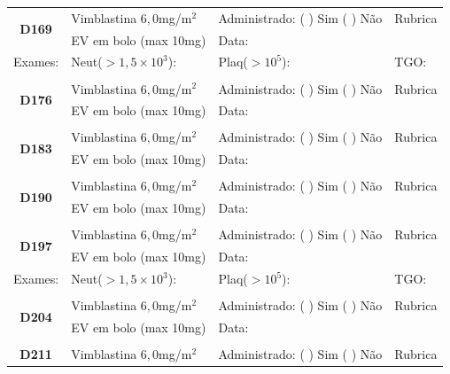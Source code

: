 \documentclass[11pt,a4paper,oldfontcommands]{memoir}
\begin{document}
\begin{center}
\begin{table}[H]
\begin{tabular}{p{}p{}|p{}|p{3cm}}
\end{tabular}
\end{table}
\clearpage
\begin{table}[H]
\begin{tabular}{p{}p{}|p{}|p{3cm}}
    \hline
    \multicolumn{1}{c|}{\multirow{2}{*}{\textbf{D169}}}&{Vimblastina \(6,0\)mg/m\(^2\)}&{Administrado: (  ) Sim (  ) Não}&{Rubrica}\\
    \multicolumn{1}{c|}{}&{EV em bolo (max 10mg)}&{Data:}&\\
    \hline
    {Exames:}&{Neut(\(>1,5\times10^3\)):}&{Plaq(\(>10^5\)):}&{TGO:}
    \\
    \hline\\
    \hline
    \multicolumn{1}{c|}{\multirow{2}{*}{\textbf{D176}}}&{Vimblastina \(6,0\)mg/m\(^2\)}&{Administrado: (  ) Sim (  ) Não}&{Rubrica}\\
    \multicolumn{1}{c|}{}&{EV em bolo (max 10mg)}&{Data:}&\\
    \hline\\
    \hline
    \multicolumn{1}{c|}{\multirow{2}{*}{\textbf{D183}}}&{Vimblastina \(6,0\)mg/m\(^2\)}&{Administrado: (  ) Sim (  ) Não}&{Rubrica}\\
    \multicolumn{1}{c|}{}&{EV em bolo (max 10mg)}&{Data:}&\\
    \hline
    \\
    \hline
    \multicolumn{1}{c|}{\multirow{2}{*}{\textbf{D190}}}&{Vimblastina \(6,0\)mg/m\(^2\)}&{Administrado: (  ) Sim (  ) Não}&{Rubrica}\\
    \multicolumn{1}{c|}{}&{EV em bolo (max 10mg)}&{Data:}&\\
    \hline
    \\
    \hline
    \multicolumn{1}{c|}{\multirow{2}{*}{\textbf{D197}}}&{Vimblastina \(6,0\)mg/m\(^2\)}&{Administrado: (  ) Sim (  ) Não}&{Rubrica}\\
    \multicolumn{1}{c|}{}&{EV em bolo (max 10mg)}&{Data:}&\\
    \hline
    {Exames:}&{Neut(\(>1,5\times10^3\)):}&{Plaq(\(>10^5\)):}&{TGO:}
    \\
    \hline
    \\
    \hline
    \multicolumn{1}{c|}{\multirow{2}{*}{\textbf{D204}}}&{Vimblastina \(6,0\)mg/m\(^2\)}&{Administrado: (  ) Sim (  ) Não}&{Rubrica}\\
    \multicolumn{1}{c|}{}&{EV em bolo (max 10mg)}&{Data:}&\\
    \hline
    \\
    \hline
    \multicolumn{1}{c|}{\multirow{2}{*}{\textbf{D211}}}&{Vimblastina \(6,0\)mg/m\(^2\)}&{Administrado: (  ) Sim (  ) Não}&{Rubrica}\\

\end{tabular}
\end{table}
\end{center}
\end{document}
